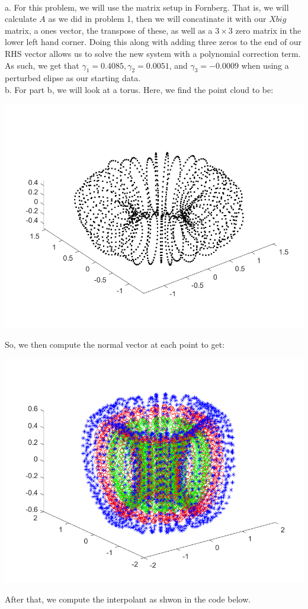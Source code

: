 \begin{solution}\renewcommand{\qedsymbol}{}\ \\

    a. For this problem, we will use the matrix setup in Fornberg. That is, we will calculate $A$ as we
    did in problem 1, then we will concatinate it with our $Xbig$ matrix, a ones vector, the transpose
    of these, as well as a $3\times3$ zero matrix in the lower left hand corner. Doing this along with
    adding three zeros to the end of our RHS vector allows us to solve the new system with a
    polynomial correction term. As such, we get that $\gamma_1=0.4085, \gamma_2=0.0051$, and
    $\gamma_3=-0.0009$ when using a perturbed elipse as our starting data.\\

    b. For part b, we will look at a torus. Here, we find the point cloud to be:

    \begin{center}
        \includegraphics[scale=0.5]{problem2bcloud.PNG}
    \end{center}

    So, we then compute the normal vector at each point to get:
    
    \begin{center}
        \includegraphics[scale=0.7]{problem2bnorm.PNG}
    \end{center}

    After that, we compute the interpolant as shwon in the code below.

\end{solution}